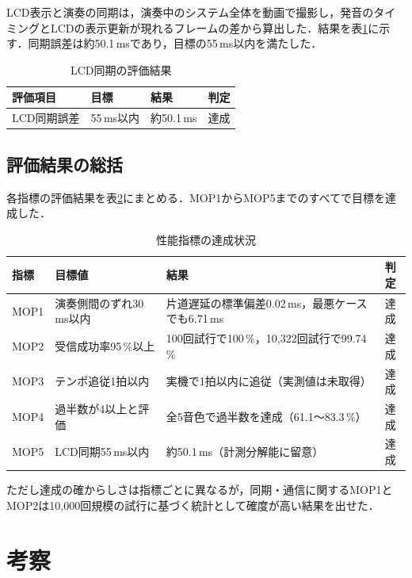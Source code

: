 \documentclass[uplatex,dvipdfmx]{jlreq}
\begin{document}
LCD表示と演奏の同期は，演奏中のシステム全体を動画で撮影し，発音のタイミングとLCDの表示更新が現れるフレームの差から算出した．結果を表\ref{tab:lcd-result}に示す．同期誤差は約50.1\,msであり，目標の55\,ms以内を満たした．

\begin{table}[tb]
\caption{LCD同期の評価結果}
\label{tab:lcd-result}
\begin{center}
\small
\begin{tabular}{llll}
\hline
評価項目 & 目標 & 結果 & 判定 \\
\hline
LCD同期誤差 & 55\,ms以内 & 約50.1\,ms & 達成 \\
\hline
\end{tabular}
\end{center}
\end{table}

\subsection{評価結果の総括}

各指標の評価結果を表\ref{tab:overall-result}にまとめる．MOP1からMOP5までのすべてで目標を達成した．

\begin{table}[tb]
\caption{性能指標の達成状況}
\label{tab:overall-result}
\begin{center}
\footnotesize
\begin{tabular}{llp{13em}c}
\hline
指標 & 目標値 & 結果 & 判定 \\
\hline
MOP1 & 演奏側間のずれ30\,ms以内 & 片道遅延の標準偏差0.02\,ms，最悪ケースでも6.71\,ms & 達成 \\
MOP2 & 受信成功率95\,\%以上 & 100回試行で100\,\%，10{,}322回試行で99.74\,\% & 達成 \\
MOP3 & テンポ追従1拍以内 & 実機で1拍以内に追従（実測値は未取得） & 達成 \\
MOP4 & 過半数が4以上と評価 & 全5音色で過半数を達成（61.1〜83.3\,\%）& 達成 \\
MOP5 & LCD同期55\,ms以内 & 約50.1\,ms（計測分解能に留意） & 達成 \\
\hline
\end{tabular}
\end{center}
\end{table}

ただし達成の確からしさは指標ごとに異なるが，同期・通信に関するMOP1とMOP2は10{,}000回規模の試行に基づく統計として確度が高い結果を出せた．

\section{考察}
\label{sec:discuss}
\end{document}
